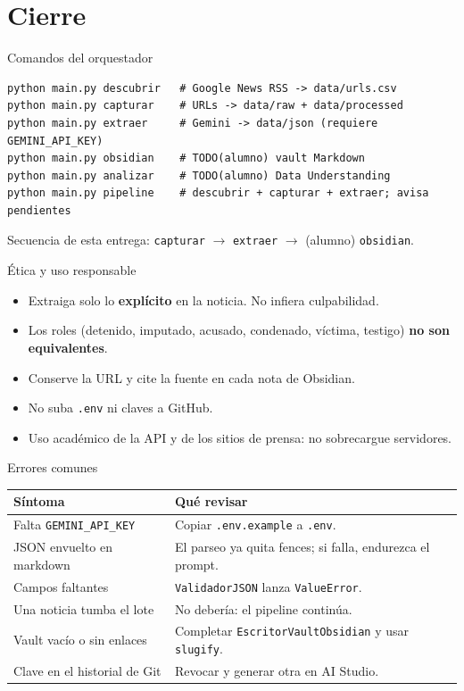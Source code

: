 \documentclass[11pt,aspectratio=169]{beamer}
\newcommand{\code}[1]{\texttt{#1}}
\begin{document}
\section{Cierre}

\begin{frame}[fragile]{Comandos del orquestador}
\tiny
\begin{lstlisting}
python main.py descubrir   # Google News RSS -> data/urls.csv
python main.py capturar    # URLs -> data/raw + data/processed
python main.py extraer     # Gemini -> data/json (requiere GEMINI_API_KEY)
python main.py obsidian    # TODO(alumno) vault Markdown
python main.py analizar    # TODO(alumno) Data Understanding
python main.py pipeline    # descubrir + capturar + extraer; avisa pendientes
\end{lstlisting}

\scriptsize
Secuencia de esta entrega: \code{capturar} $\rightarrow$ \code{extraer} $\rightarrow$ (alumno) \code{obsidian}.
\end{frame}

\begin{frame}{Ética y uso responsable}
\small
\begin{itemize}
\item Extraiga solo lo \textbf{explícito} en la noticia. No infiera culpabilidad.
\item Los roles (detenido, imputado, acusado, condenado, víctima, testigo) \textbf{no son equivalentes}.
\item Conserve la URL y cite la fuente en cada nota de Obsidian.
\item No suba \code{.env} ni claves a GitHub.
\item Uso académico de la API y de los sitios de prensa: no sobrecargue servidores.
\end{itemize}
\end{frame}

\begin{frame}{Errores comunes}
\scriptsize
\begin{center}
\begin{tabular}{p{5.4cm}p{6.6cm}}
\toprule
\textbf{Síntoma} & \textbf{Qué revisar} \\
\midrule
Falta \code{GEMINI\_API\_KEY} & Copiar \code{.env.example} a \code{.env}. \\
JSON envuelto en markdown & El parseo ya quita fences; si falla, endurezca el prompt. \\
Campos faltantes & \code{ValidadorJSON} lanza \code{ValueError}. \\
Una noticia tumba el lote & No debería: el pipeline continúa. \\
Vault vacío o sin enlaces & Completar \code{EscritorVaultObsidian} y usar \code{slugify}. \\
Clave en el historial de Git & Revocar y generar otra en AI Studio. \\
\bottomrule
\end{tabular}
\end{center}
\end{frame}
\end{document}
